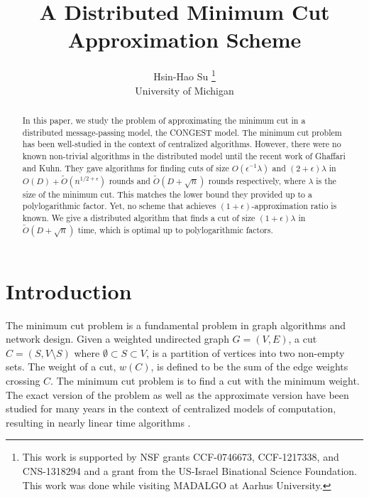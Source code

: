 \documentclass[11pt]{article}
\begin{document}
\begin{titlepage}
\title{A Distributed Minimum Cut Approximation Scheme}
\author{Hsin-Hao Su \footnote{This work is supported by NSF grants CCF-0746673, CCF-1217338, and CNS-1318294
and a grant from the US-Israel Binational Science Foundation. This work was done while visiting MADALGO at Aarhus University.}\\
University of Michigan}
\date{}
\end{titlepage}


\maketitle

\begin{abstract}
In this paper, we study the problem of approximating the minimum cut in a distributed message-passing model, the \textsf{CONGEST} model. The minimum cut problem has been well-studied in the context of centralized algorithms. However, there were no known non-trivial algorithms in the distributed model until the recent work of Ghaffari and Kuhn. They gave algorithms for finding cuts of size $O(\epsilon^{-1}\lambda)$ and $(2+\epsilon)\lambda$ in $O(D)+\tilde{O}(n^{1/2+\epsilon})$ rounds and $\tilde{O}(D+\sqrt{n})$ rounds respectively, where $\lambda$ is the size of the minimum cut. This matches the lower bound they provided up to a polylogarithmic factor. Yet, no scheme that achieves $(1+\epsilon)$-approximation ratio is known. We give a distributed algorithm that finds a cut of size $(1+\epsilon)\lambda$ in $\tilde{O}(D+\sqrt{n})$ time, which is optimal up to polylogarithmic factors.
\end{abstract}
\thispagestyle{empty}

\setcounter{page}{1}

\section{Introduction}
The minimum cut problem is a fundamental problem in graph algorithms and network design. Given a weighted undirected graph $G=(V,E)$, a cut $C=(S,V \setminus S)$ where $\emptyset \subset S \subset V$, is a partition of vertices into two non-empty sets. The weight of a cut, $w(C)$, is defined to be the sum of the edge weights crossing $C$. The minimum cut problem is to find a cut with the minimum weight. The exact version of the problem as well as the approximate version have been studied for many years \cite{Karger93, KS93, Karger94b, NI92, Matula93, Gabow95, SW97, Karger2000} in the context of centralized models of computation, resulting in nearly linear time algorithms \cite{Karger2000, Matula93, Karger94b}. 
\end{document}
